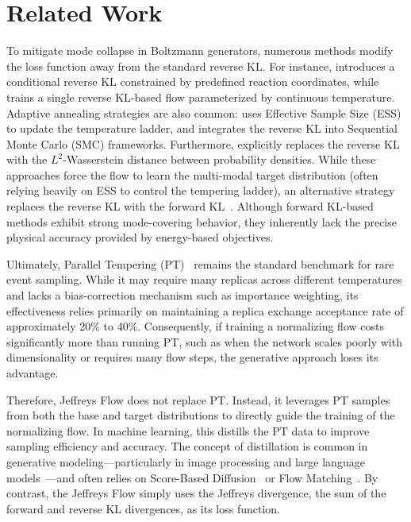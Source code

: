 \documentclass[%
 reprint,
 amsmath,amssymb,
 aps,
 pre,
]{revtex4-2}
\begin{document}
\section{Related Work}
\label{section: related works}

To mitigate mode collapse in Boltzmann generators, numerous methods modify the loss function away from the standard reverse KL. For instance, \cite{falkner2023conditioning} introduces a conditional reverse KL constrained by predefined reaction coordinates, while \cite{dibak2022temperature} trains a single reverse KL-based flow parameterized by continuous temperature. Adaptive annealing strategies are also common: \cite{wang2025mitigating} uses Effective Sample Size (ESS) to update the temperature ladder, and \cite{matthews2022continual} integrates the reverse KL into Sequential Monte Carlo (SMC) frameworks. Furthermore, \cite{qiu2024efficient} explicitly replaces the reverse KL with the $L^2$-Wasserstein distance between probability densities. While these approaches force the flow to learn the multi-modal target distribution (often relying heavily on ESS to control the tempering ladder), an alternative strategy replaces the reverse KL with the forward KL~\cite{gabrie2022adaptive, abernethy2024flow}. Although forward KL-based methods exhibit strong mode-covering behavior, they inherently lack the precise physical accuracy provided by energy-based objectives.

Ultimately, Parallel Tempering (PT)~\cite{earl2005parallel, syed2022non} remains the standard benchmark for rare event sampling. While it may require many replicas across different temperatures and lacks a bias-correction mechanism such as importance weighting, its effectiveness relies primarily on maintaining a replica exchange acceptance rate of approximately 20\% to 40\%. Consequently, if training a normalizing flow costs significantly more than running PT, such as when the network scales poorly with dimensionality or requires many flow steps, the generative approach loses its advantage.

Therefore, Jeffreys Flow does not replace PT. Instead, it leverages PT samples from both the base and target distributions to directly guide the training of the normalizing flow.
In machine learning, this distills the PT data to improve sampling efficiency and accuracy. The concept of distillation is common in generative modeling---particularly in image processing and large language models~\cite{luhman2021knowledge, zhou2024simple, xie2024distillation, fu2025moflow}---and often relies on Score-Based Diffusion~\cite{song2021maximum, batzolis2021conditional} or Flow Matching~\cite{lipman2022flow, chen2023flow}. By contrast, the Jeffreys Flow simply uses the Jeffreys divergence, the sum of the forward and reverse KL divergences, as its loss function.
\end{document}
